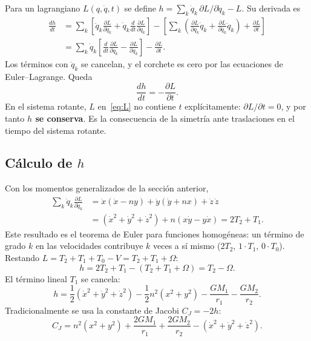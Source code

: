 \documentclass[12pt,letterpaper]{article}
\begin{document}
Para un lagrangiano $L(q,\dot q,t)$ se define
$h = \sum_k \dot q_k\,\partial L/\partial \dot q_k - L$. Su derivada es
\begin{align*}
\frac{dh}{dt} &= \sum_k\left[\ddot q_k\frac{\partial L}{\partial \dot q_k}
  + \dot q_k\frac{d}{dt}\frac{\partial L}{\partial \dot q_k}\right]
  - \left[\sum_k\left(\frac{\partial L}{\partial q_k}\dot q_k
  + \frac{\partial L}{\partial \dot q_k}\ddot q_k\right) + \frac{\partial L}{\partial t}\right]\\
&= \sum_k \dot q_k\left[\frac{d}{dt}\frac{\partial L}{\partial \dot q_k} - \frac{\partial L}{\partial q_k}\right]
  - \frac{\partial L}{\partial t}.
\end{align*}
Los términos con $\ddot q_k$ se cancelan, y el corchete es cero por las ecuaciones de
Euler--Lagrange. Queda
\[
\frac{dh}{dt} = -\frac{\partial L}{\partial t}.
\]
En el sistema rotante, $L$ en~\eqref{eq:L} no contiene $t$ explícitamente:
$\partial L/\partial t = 0$, y por tanto \textbf{$h$ se conserva}. Es la consecuencia de la
simetría ante traslaciones en el tiempo del sistema rotante.

\subsection{Cálculo de $h$}

Con los momentos generalizados de la sección anterior,
\begin{align*}
\sum_k \dot q_k \frac{\partial L}{\partial \dot q_k}
&= \dot x(\dot x - n y) + \dot y(\dot y + n x) + \dot z\,\dot z\\
&= (\dot x^2+\dot y^2+\dot z^2) + n(x\dot y - y\dot x) = 2T_2 + T_1 .
\end{align*}
Este resultado es el teorema de Euler para funciones homogéneas: un término de grado $k$ en
las velocidades contribuye $k$ veces a sí mismo ($2T_2$, $1\cdot T_1$, $0\cdot T_0$). Restando
$L = T_2 + T_1 + T_0 - V = T_2 + T_1 + \Omega$:
\[
h = 2T_2 + T_1 - (T_2 + T_1 + \Omega) = T_2 - \Omega .
\]
El término lineal $T_1$ se cancela:
\begin{equation}
h = \frac12\left(\dot x^2+\dot y^2+\dot z^2\right) - \frac12 n^2(x^2+y^2) - \frac{GM_1}{r_1} - \frac{GM_2}{r_2}.
\label{eq:h}
\end{equation}
Tradicionalmente se usa la constante de Jacobi $C_J = -2h$:
\begin{equation}
C_J = n^2(x^2+y^2) + \frac{2GM_1}{r_1} + \frac{2GM_2}{r_2} - \left(\dot x^2+\dot y^2+\dot z^2\right).
\label{eq:CJ}
\end{equation}
\end{document}
